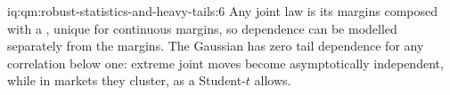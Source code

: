 \begin{solution}{iq:qm:robust-statistics-and-heavy-tails:6}
Any joint law is its margins composed with a , unique for continuous margins, so dependence can be modelled separately from the margins. The
Gaussian  has zero tail dependence for any correlation below one: extreme joint moves become asymptotically independent, while in markets
they cluster, as a Student-$t$  allows.
\end{solution}
